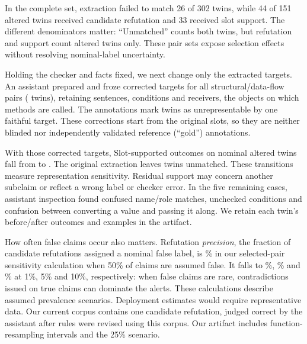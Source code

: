 In the complete set, extraction failed to match 26 of 302 twins, while 44 of 151 altered twins received candidate refutation and 33 received slot support. The different denominators matter: ``Unmatched'' counts both twins, but refutation and support count altered twins only. These pair sets expose selection effects without resolving nominal-label uncertainty.

Holding the checker and facts fixed, we next change only the extracted targets. An assistant prepared and froze corrected targets for all \RevAblPairs{} structural/data-flow pairs (\RevAblTwins{} twins), retaining sentences, conditions and receivers, the objects on which methods are called. The annotations mark \RevAblUnrep{} twins as unrepresentable by one faithful target. These corrections start from the original slots, so they are neither blinded nor independently validated reference (``gold'') annotations.

With those corrected targets, Slot-supported outcomes on nominal altered twins fall from \RevAblBefore{} to \RevAblAfter{}. The original extraction leaves \RevAblLost{} twins unmatched. These transitions measure representation sensitivity. Residual support may concern another subclaim or reflect a wrong label or checker error. In the five remaining cases, assistant inspection found confused name/role matches, unchecked conditions and confusion between converting a value and passing it along. We retain each twin's before/after outcomes and examples in the artifact.

How often false claims occur also matters. Refutation \emph{precision}, the fraction of candidate refutations assigned a nominal false label, is \RevPrecHalf\% in our selected-pair sensitivity calculation when 50\% of claims are assumed false. It falls to \RevPrecOne\%, \RevPrecFive\% and \RevPrecTen\% at 1\%, 5\% and 10\%, respectively: when false claims are rare, contradictions issued on true claims can dominate the alerts. These calculations describe assumed prevalence scenarios. Deployment estimates would require representative data. Our current corpus contains one candidate refutation, judged correct by the assistant after rules were revised using this corpus. Our artifact includes function-resampling intervals and the 25\% scenario.
